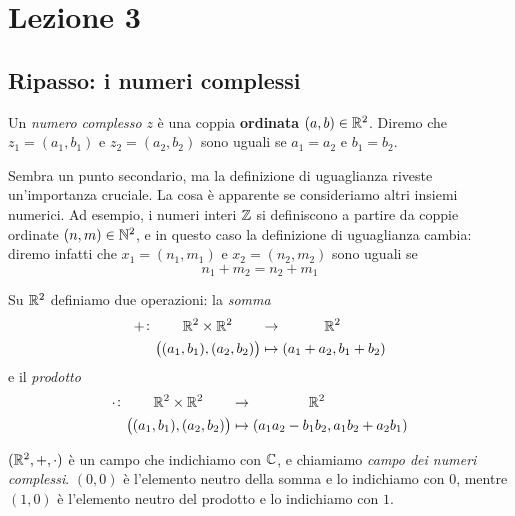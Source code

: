 \section{Lezione 3}
\subsection{Ripasso: i numeri complessi}
\begin{definition}
    \label{def:3.1}
    Un \emph{numero complesso} $z$ è una coppia \textbf{ordinata} $(a,b)\in\amsbb{R}^2$. Diremo che $z_1 =(a_1, b_1)$ e $z_2 = (a_2, b_2)$ sono uguali se $a_1 = a_2$ e $b_1 = b_2$.
\end{definition}
\begin{remark}
    Sembra un punto secondario, ma la definizione di uguaglianza riveste un'importanza cruciale. La cosa è apparente se consideriamo altri insiemi numerici. Ad esempio, i numeri interi $\amsbb{Z}$ si definiscono a partire da coppie ordinate $(n, m)\in\amsbb{N}^2$, e in questo caso la definizione di uguaglianza cambia: diremo infatti che $x_1 = (n_1, m_1)$ e $x_2=(n_2, m_2)$ sono uguali se
    \[
    n_1 +m_2 = n_2 + m_1
    \]
\end{remark}
\begin{definition}
    \label{def:3.2}
    Su $\amsbb{R}^2$ definiamo due operazioni: la \emph{somma}
    \[
    \begin{split}
        +\colon \qquad  \amsbb{R}^2 \times \amsbb{R}^2 \qquad &\to \qquad \quad \amsbb{R}^2 \\
        \left((a_1, b_1), (a_2, b_2)\right)&\mapsto (a_1+a_2, b_1 + b_2)
    \end{split}
    \]
    e il \emph{prodotto}
    \[
    \begin{split}
        \cdot\colon \qquad  \amsbb{R}^2 \times \amsbb{R}^2 \qquad &\to \qquad \qquad \amsbb{R}^2 \\
        \left((a_1, b_1), (a_2, b_2)\right)&\mapsto (a_1a_2-b_1b_2, a_1b_2 + a_2b_1)
    \end{split}
    \]
\end{definition}
\begin{theorem}
    \label{th:3.1}
    $(\amsbb{R}^2, +, \cdot)$ è un campo che indichiamo con $\amsbb{C}$, e chiamiamo \emph{campo dei numeri complessi}. $(0,0)$ è l'elemento neutro della somma e lo indichiamo con $0$, mentre $(1,0)$ è l'elemento neutro del prodotto e lo indichiamo con $1$.
\end{theorem}
